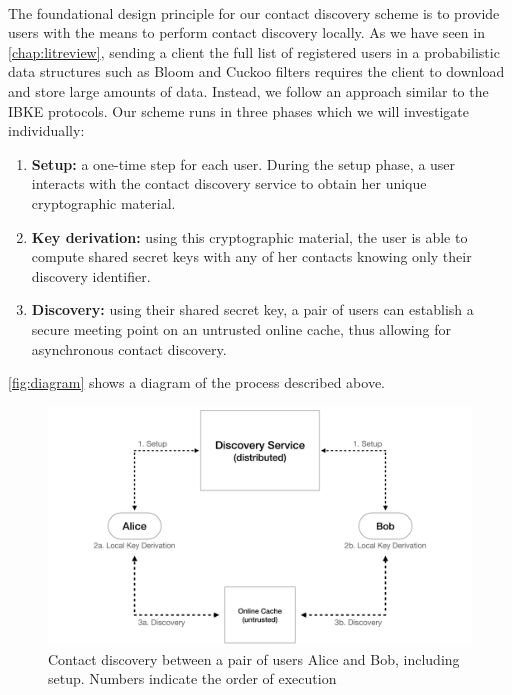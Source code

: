 \paragraph{} The foundational design principle for our contact discovery scheme is to provide users with the means to perform contact discovery locally. As we have seen in \autoref{chap:litreview}, sending a client the full list of registered users in a probabilistic data structures such as Bloom and Cuckoo filters requires the client to download and store large amounts of data. Instead, we follow an approach similar to the IBKE protocols. Our scheme runs in three phases which we will investigate individually:
\begin{enumerate}
	\item \textbf{Setup:} a one-time step for each user. During the setup phase, a user interacts with the contact discovery service to obtain her unique cryptographic material.
	\item \textbf{Key derivation:} using this cryptographic material, the user is able to compute shared secret keys with any of her contacts knowing only their discovery identifier.	\item \textbf{Discovery:} using their shared secret key, a pair of users can establish a secure meeting point on an untrusted online cache, thus allowing for asynchronous contact discovery.
\end{enumerate}

\noindent \autoref{fig:diagram} shows a diagram of the process described above.

\begin{figure}[H]
	\begin{center}	
	  \includegraphics[width=\textwidth]{figures/system}
	  \caption{Contact discovery between a pair of users Alice and Bob, including setup. Numbers indicate the order of execution}
	  \label{fig:diagram}
	 \end{center}
 \end{figure}

